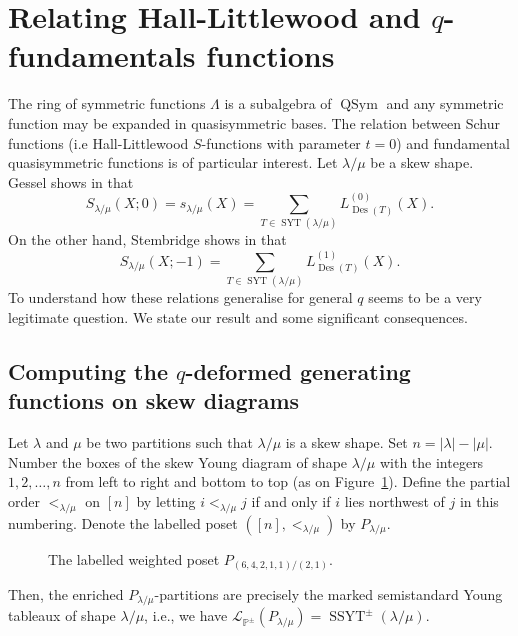 \documentclass[revision]{FPSAC2024}
\newcommand{\la}{\lambda}
\newcommand{\PP}{\mathbb{P}} %
\newcommand{\QSym}{\operatorname{QSym}}
\newcommand{\SYT}{\operatorname{SYT}}
\newcommand{\SSYT}{\operatorname{SSYT}}
\newcommand{\Des}{\operatorname{Des}}
\begin{document}
\section{Relating Hall-Littlewood and $q$-fundamentals functions}
The ring of symmetric functions $\Lambda$ is a subalgebra of $\QSym$ and any symmetric function may be expanded in quasisymmetric bases. The relation between Schur functions (i.e Hall-Littlewood $S$-functions with parameter $t=0$) and fundamental quasisymmetric functions is of particular interest. Let $\la /\mu$ be a skew shape. Gessel shows in \cite{Ges84} that
\begin{equation}
\label{equation.S0L}
S_{\la/\mu}(X; 0) = s_{\la/\mu}(X) = \sum_{T \in \SYT(\la/\mu)}L^{(0)}_{\Des(T)}(X).
\end{equation}
On the other hand, Stembridge shows in \cite{Ste97} that
\begin{equation}
\label{equation.S1L}
S_{\la/\mu}(X; -1) = \sum_{T \in \SYT(\la/\mu)}L^{(1)}_{\Des(T)}(X).
\end{equation}
To understand how these relations generalise for general $q$ seems to be a very legitimate question. We state our result and  some significant consequences. 
\subsection{Computing the $q$-deformed generating functions on skew diagrams}
Let $\lambda$ and $\mu$ be two partitions such that $\lambda/\mu$ is a skew shape.
Set $n = |\la| - |\mu|$.
Number the boxes of the skew Young diagram of shape $\lambda/\mu$ with the integers $1, 2, \ldots, n$ from left to right and bottom to top (as on Figure~\ref{fig.young_poset}). Define the partial order $<_{\la/\mu}$ on $[n]$ by letting $i <_{\la/\mu} j$ if and only if $i$ lies northwest of $j$ in this numbering.
Denote the labelled poset $([n], <_{\la/\mu})$ by $P_{\lambda/\mu}$.
%
\begin{figure}[htbp]
\begin{center}
\end{center}
\caption{The labelled weighted poset $P_{(6,4,2,1,1)/(2,1)}$.}
\label{fig.young_poset}
\end{figure}
%
Then, the enriched $P_{\lambda/\mu}$-partitions are precisely the marked semistandard Young tableaux of shape $\lambda/\mu$, i.e., we have $\mathcal{L}_{\PP^{\pm}}(P_{\lambda/\mu}) = \SSYT^\pm(\la/\mu)$.
%
\end{document}
